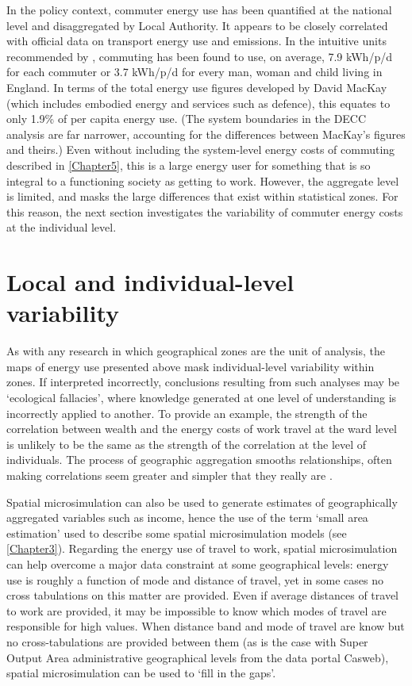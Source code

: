 In the policy context, commuter energy use has been
quantified at the national level and disaggregated by Local Authority.
It appears to be closely correlated with official data on transport energy
use and emissions. In the intuitive units recommended by \citet{MacKay2009},
commuting has been found to use, on average, 7.9 kWh/p/d for each commuter or
3.7 kWh/p/d for every man, woman and child living in England. In terms of
the total energy use figures developed by David MacKay (which includes
embodied energy and services such as defence), this equates to
only 1.9\% of per capita energy use. (The system boundaries in the
DECC analysis are far narrower, accounting for the differences between
MacKay's figures and theirs.) Even without including the system-level
energy costs of commuting described in \cref{Chapter5}, this is a large
energy user for something that is so integral to a functioning society as
getting to work. However, the aggregate level is limited, and masks the
large differences that exist within statistical zones.
For this reason, the next section investigates the variability of commuter
energy costs at the individual level.


\section{Local and individual-level variability} \label{sindvar}

As with any research in which geographical zones are the unit of analysis,
the maps of energy use presented above mask individual-level variability within
zones. If interpreted incorrectly, conclusions resulting from such analyses
may be `ecological fallacies', where knowledge generated
at one level of understanding is incorrectly applied to another.
To provide an example, the strength of the correlation between wealth and the energy
costs of work travel at the ward level is unlikely to be the same as the
strength of the correlation at the level of individuals. The process of
geographic aggregation smooths relationships, often making correlations seem
greater and simpler that they really are \citep{Openshaw1983}. 

Spatial microsimulation can also be used to generate estimates of
geographically aggregated variables such as income, hence the use of the term
`small area estimation' used to describe some spatial microsimulation models
(see \cref{Chapter3}). Regarding the energy use of travel to work, spatial
microsimulation can help overcome a major data constraint at some geographical
levels: energy use is roughly a function of mode and distance of travel, yet
in some cases no cross tabulations on this matter are provided.
Even if average distances of travel to work are provided, it may be
impossible to know which modes of travel are responsible for high values.
When distance band and mode of travel are know but no cross-tabulations
are provided between them (as is the case with Super Output Area administrative
geographical levels from the data portal Casweb),
spatial microsimulation can be used to `fill in the gaps'.



